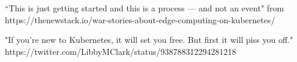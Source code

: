 “This is just getting started and this is a process — and not an event"
from https://thenewstack.io/war-stories-about-edge-computing-on-kubernetes/

"If you’re new to Kubernetes, it will set you free. But first it will piss you off." 
https://twitter.com/LibbyMClark/status/938788312294281218